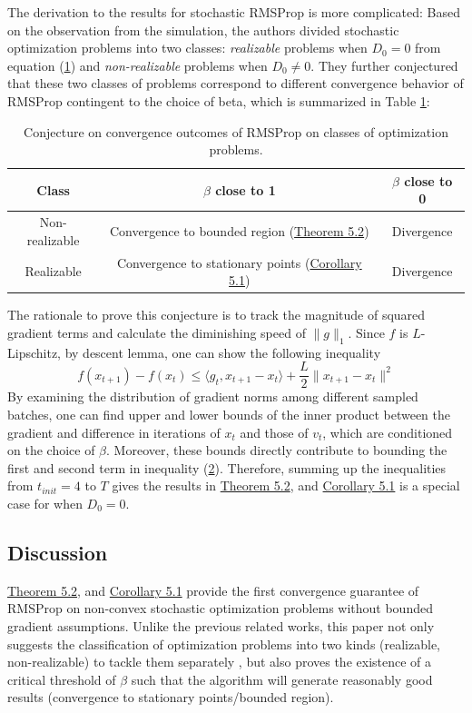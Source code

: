 \documentclass{article}
\begin{document}
\newline
The derivation to the results for stochastic RMSProp is more complicated: Based on the observation from the simulation, the authors divided stochastic optimization problems into two classes: \textit{realizable} problems when $D_0 = 0$ from equation (\hyperref[eq51]{1}) and  \textit{non-realizable} problems when $D_0 \neq 0$. They further conjectured that these two classes of problems correspond to different convergence behavior of RMSProp contingent to the choice of beta, which is summarized in Table \hyperref[tb1]{1}:
\begin{table}[h]
\label{tb1}
\centering
\begin{tabular}{c|c | c}
	\hline
	Class & $\beta$ close to 1 & $\beta$ close to 0\\
	\hline
	Non-realizable & Convergence to bounded region (\hyperref[theom51]{Theorem 5.2}) & Divergence\\
	Realizable & Convergence to stationary points (\hyperref[coro51]{Corollary 5.1}) & Divergence\\
	\hline
\end{tabular}
\vspace{2pt}
\caption{Conjecture on convergence outcomes of RMSProp on classes of optimization problems.}
\end{table}
\newline
The rationale to prove this conjecture is to track the magnitude of squared gradient terms and calculate the diminishing speed of $\|g\|_1$. Since $f$ is $L$-Lipschitz, by descent lemma, one can show the following inequality
\begin{equation}
\label{eq52}
f(x_{t + 1}) - f(x_{t}) \leq \langle g_t, x_{t + 1} - x_{t}\rangle + \frac{L}{2}\|x_{t + 1} - x_{t}\|^2
\end{equation}
By examining the distribution of gradient norms among different sampled batches, one can find upper and lower bounds of the inner product between the gradient and difference in iterations of $x_t$ and those of $v_t$, which are conditioned on the choice of $\beta$. Moreover, these bounds directly contribute to bounding the first and second term in inequality  (\hyperref[eq52]{2}). Therefore, summing up the inequalities from $t_{init} = 4$ to $T$ gives the results in \hyperref[theom51]{Theorem 5.2}, and \hyperref[coro51]{Corollary 5.1} is a special case for when $D_0 = 0$.
\subsection{Discussion}
\hyperref[theom51]{Theorem 5.2}, and \hyperref[coro51]{Corollary 5.1} provide the first convergence guarantee of RMSProp on non-convex stochastic optimization problems without bounded gradient assumptions. Unlike the previous related works, this paper not only suggests the classification of optimization problems into two kinds (realizable, non-realizable) to tackle them separately , but also proves the existence of a critical threshold of $\beta$ such that the algorithm will generate reasonably good results (convergence to stationary points/bounded region).
\end{document}
